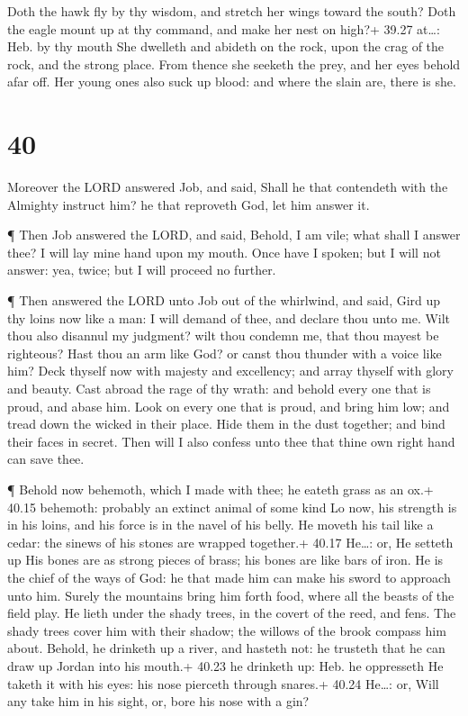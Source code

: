  Doth the hawk fly by thy wisdom, and stretch her wings
toward the south?  Doth the eagle mount up at thy command,
and make her nest on high?+ 39.27 at\ldots: Heb. by thy mouth
 She dwelleth and abideth on the rock, upon the crag of the
rock, and the strong place.  From thence she seeketh the
prey, and her eyes behold afar off.  Her young ones also
suck up blood: and where the slain are, there is she.

\hypertarget{section-39}{%
\section{40}\label{section-39}}

 Moreover the LORD answered Job, and said, 
Shall he that contendeth with the Almighty instruct him? he that
reproveth God, let him answer it.

 ¶ Then Job answered the LORD, and said, 
Behold, I am vile; what shall I answer thee? I will lay mine hand upon
my mouth.  Once have I spoken; but I will not answer: yea,
twice; but I will proceed no further.

 ¶ Then answered the LORD unto Job out of the whirlwind, and
said,  Gird up thy loins now like a man: I will demand of
thee, and declare thou unto me.  Wilt thou also disannul my
judgment? wilt thou condemn me, that thou mayest be righteous?
 Hast thou an arm like God? or canst thou thunder with a
voice like him?  Deck thyself now with majesty and
excellency; and array thyself with glory and beauty.  Cast
abroad the rage of thy wrath: and behold every one that is proud, and
abase him.  Look on every one that is proud, and bring him
low; and tread down the wicked in their place.  Hide them
in the dust together; and bind their faces in secret.  Then
will I also confess unto thee that thine own right hand can save thee.

 ¶ Behold now behemoth, which I made with thee; he eateth
grass as an ox.+ 40.15 behemoth: probably an extinct animal of some kind
 Lo now, his strength is in his loins, and his force is in
the navel of his belly.  He moveth his tail like a cedar:
the sinews of his stones are wrapped together.+ 40.17 He\ldots: or, He
setteth up  His bones are as strong pieces of brass; his
bones are like bars of iron.  He is the chief of the ways
of God: he that made him can make his sword to approach unto him.
 Surely the mountains bring him forth food, where all the
beasts of the field play.  He lieth under the shady trees,
in the covert of the reed, and fens.  The shady trees cover
him with their shadow; the willows of the brook compass him about.
 Behold, he drinketh up a river, and hasteth not: he
trusteth that he can draw up Jordan into his mouth.+ 40.23 he drinketh
up: Heb. he oppresseth  He taketh it with his eyes: his
nose pierceth through snares.+ 40.24 He\ldots: or, Will any take him in
his sight, or, bore his nose with a gin?

